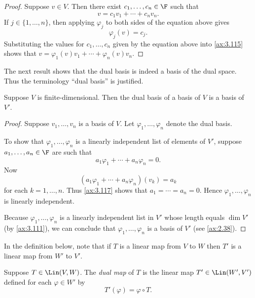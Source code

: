 \begin{proof}
Suppose $v\in V$. Then there exist $c_1,\dots,c_n\in\F$ such
that
\begin{equation*}
v = c_1v_1+\cdots+c_nv_n. \tag*{\thetheorem}\label{ax:3.115}
\end{equation*}
If $j\in\{1,\dots,n\}$, then applying $\varphi_j$ to both sides of the equation
above gives
\[ \varphi_j(v) = c_j. \]
Substituting the values for $c_1,\dots,c_n$ given by the equation above into
\ref{ax:3.115} shows that $v=\varphi_1(v)v_1+\cdots+\varphi_n(v)v_n$.
\end{proof}

The next result shows that the dual basis is indeed a basis of the dual space.
Thus the terminology ``dual basis'' is justified.

\begin{result}\label{ax:3.116}
Suppose $V$ is finite-dimensional. Then the dual basis of a basis of $V$ is a
basis of $V'$.
\end{result}

\begin{proof}
Suppose $v_1,\dots,v_n$ is a basis of $V$. Let $\varphi_1,\dots,\varphi_n$ denote
the dual basis.

To show that $\varphi_1,\dots,\varphi_n$ is a linearly independent list of
elements of $V'$, suppose $a_1,\dots,a_n\in\F$ are such
that
\begin{equation*}
a_1\varphi_1+\cdots+a_n\varphi_n = 0. \tag*{\thetheorem}\label{ax:3.117}
\end{equation*}
Now
\[ (a_1\varphi_1+\cdots+a_n\varphi_n)(v_k) = a_k \]
for each $k=1,\dots,n$. Thus \ref{ax:3.117} shows that $a_1=\cdots=a_n=0$. Hence
$\varphi_1,\dots,\varphi_n$ is linearly independent.

Because $\varphi_1,\dots,\varphi_n$ is a linearly independent list in $V'$ whose
length equals $\dim V'$ (by \ref{ax:3.111}), we can conclude that
$\varphi_1,\dots,\varphi_n$ is a basis of $V'$ (see \ref{ax:2.38}).
\end{proof}

In the definition below, note that if $T$ is a linear map from $V$ to $W$ then
$T'$ is a linear map from $W'$ to $V'$.

\begin{definition}\label{ax:3.118}
Suppose $T\in\Lin(V,W)$. The \emph{dual map} of $T$ is the linear map
$T'\in\Lin(W',V')$ defined for each $\varphi\in W'$ by
\[ T'(\varphi) = \varphi\circ T. \]
\end{definition}

